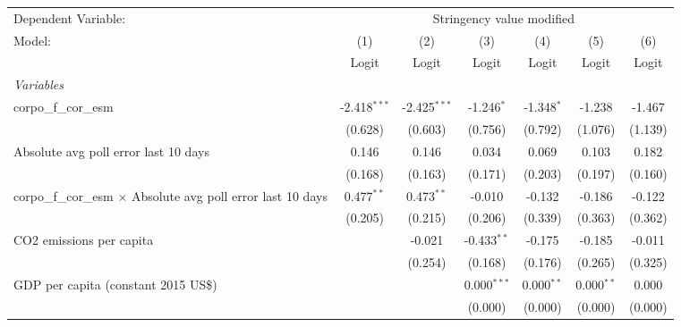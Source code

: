 
\begingroup
\centering
\begin{tabular}{lcccccc}
   \toprule
   Dependent Variable: & \multicolumn{6}{c}{Stringency value modified}\\
   Model:                                                               & (1)            & (2)            & (3)           & (4)           & (5)          & (6)\\  
                                                                        &  Logit         & Logit          & Logit         & Logit         & Logit        & Logit\\  
   \midrule
   \emph{Variables}\\
   corpo\_f\_cor\_esm                                                   & -2.418$^{***}$ & -2.425$^{***}$ & -1.246$^{*}$  & -1.348$^{*}$  & -1.238       & -1.467\\   
                                                                        & (0.628)        & (0.603)        & (0.756)       & (0.792)       & (1.076)      & (1.139)\\   
   Absolute avg poll error last 10 days                                 & 0.146          & 0.146          & 0.034         & 0.069         & 0.103        & 0.182\\   
                                                                        & (0.168)        & (0.163)        & (0.171)       & (0.203)       & (0.197)      & (0.160)\\   
   corpo\_f\_cor\_esm $\times$ Absolute avg poll error last 10 days     & 0.477$^{**}$   & 0.473$^{**}$   & -0.010        & -0.132        & -0.186       & -0.122\\   
                                                                        & (0.205)        & (0.215)        & (0.206)       & (0.339)       & (0.363)      & (0.362)\\   
   CO2 emissions per capita                                             &                & -0.021         & -0.433$^{**}$ & -0.175        & -0.185       & -0.011\\   
                                                                        &                & (0.254)        & (0.168)       & (0.176)       & (0.265)      & (0.325)\\   
   GDP per capita (constant 2015 US\$)                                  &                &                & 0.000$^{***}$ & 0.000$^{**}$  & 0.000$^{**}$ & 0.000\\   
                                                                        &                &                & (0.000)       & (0.000)       & (0.000)      & (0.000)\\   

\end{tabular}
